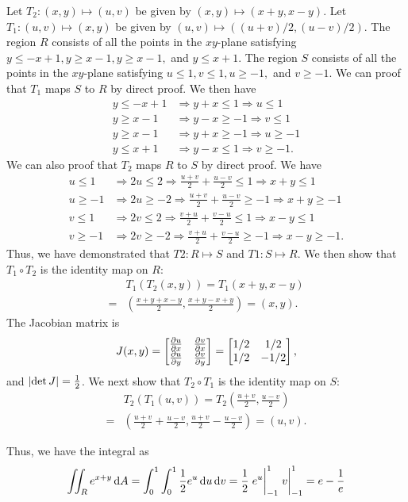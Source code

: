 \documentclass[8pt,twocolumn]{article}
\begin{document}
\begin{Answer}[number=22]
  Let $T_2:(x,y)\mapsto (u,v)$ be given by $(x,y)\mapsto(x+y, x-y)$.
  Let $T_1:(u,v)\mapsto (x,y)$ be given by $(u,v)\mapsto((u+v)/2, (u-v)/2)$.
  The region $R$ consists of all the points in the $xy$-plane satisfying $y\le
  -x+1, y\ge x-1, y\ge x-1,$ and $y\le x+1$.
  The region $S$ consists of all the points in the $xy$-plane satisfying $u\le
  1, v\le 1, u\ge -1,$ and $v\ge -1$.
  We can proof that $T_1$ maps $S$ to $R$ by direct proof. We then have
  \begin{align*}
    y\le -x+1 & \Rightarrow y+x \le 1  \Rightarrow u \le 1   \\
    y\ge x-1  & \Rightarrow y-x \ge -1 \Rightarrow v \le 1   \\
    y\ge x-1  & \Rightarrow y+x \ge -1 \Rightarrow u \ge -1  \\
    y\le x+1  & \Rightarrow y-x \le 1  \Rightarrow v \ge -1.
  \end{align*}
  We can also proof that $T_2$ maps $R$ to $S$ by direct proof. We have
  \begin{align*}
    u \le 1  & \Rightarrow 2u \le 2  \Rightarrow \frac{u+v}{2} + \frac{u-v}{2} \le 1
    \Rightarrow x+y \le 1\\
    u \ge -1 & \Rightarrow 2u \ge -2 \Rightarrow \frac{u+v}{2} + \frac{u-v}{2} \ge -1
    \Rightarrow x+y \ge -1\\
    v \le 1  & \Rightarrow 2v \le 2  \Rightarrow \frac{v+u}{2} + \frac{v-u}{2} \le 1
    \Rightarrow x-y \le 1\\
    v \ge -1 & \Rightarrow 2v \ge -2 \Rightarrow \frac{v+u}{2} + \frac{v-u}{2} \ge -1
    \Rightarrow x-y \ge -1.
  \end{align*}
  Thus, we have demonstrated that $T2: R\mapsto S$ and $T1: S\mapsto R$. We
  then show that $T_1 \circ T_2$ is the identity map on $R$:
  \begin{align*}
    &T_1(T_2(x,y)) = T_1(x+y, x-y) \\= &(\frac{x+y+x-y}{2}, \frac{x+y-x+y}{2}) =
    (x,y).
  \end{align*}
  The Jacobian matrix is
  \[
    J(x,y)={\begin{bmatrix}
      \pdv{u}{x}&\pdv{v}{x}\\
      \pdv{u}{y}&\pdv{v}{y}
    \end{bmatrix}}=
    \begin{bmatrix}1/2&1/2\\1/2&-1/2\end{bmatrix},
  \]
  and $\abs{\det J} = \frac{1}{2}$.
  We next show that $T_2 \circ T_1$ is the identity map on $S$:
  \begin{align*}
    &T_2(T_1(u,v)) = T_2(\frac{u+v}{2}, \frac{u-v}{2}) \\ =
    &(\frac{u+v}{2}+\frac{u-v}{2}, \frac{u+v}{2}-\frac{u-v}{2})=
    (u,v).
  \end{align*}

  Thus, we have the integral as
  \[
    \iint_R e^{x+y} \dd{A} = \int_0^1\int_0^1\frac{1}{2} e^u\dd{u}\dd{v} =
    \frac{1}{2}\eval{e^u}_{-1}^1 \eval{v}_{-1}^1 = e - \frac{1}{e}
  \]
\end{Answer}
\end{document}
